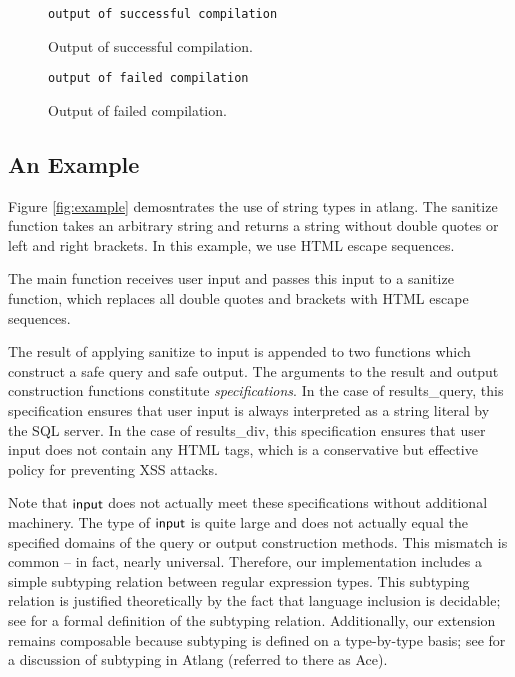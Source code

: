 \documentclass[9pt]{sig-alternate}
\theoremstyle{definition}
\begin{document}
\begin{figure}
\begin{lstlisting}
output of successful compilation
\end{lstlisting}
\caption{Output of successful compilation.}
\end{figure}

\begin{figure}
\begin{lstlisting}
output of failed compilation
\end{lstlisting}
\caption{Output of failed compilation.}
\end{figure}


\subsection{An Example}

Figure \ref{fig:example} demosntrates the use of string types in atlang.
The sanitize function takes an arbitrary string and returns a string without
double quotes or left and right brackets. In this example, we use HTML
escape sequences.

The main function receives user input and passes this input to a 
sanitize function, which replaces all double quotes and brackets with HTML
escape sequences. 

The result of applying sanitize to input is appended to two functions which
construct a safe query and safe output.
The arguments to the result and output construction functions constitute \emph{specifications}.
In the case of \textsf{results_query}, this specification ensures that user input is always interpreted
as a string literal by the SQL server.
In the case of \textsf{results_div}, this specification ensures that user input does 
not contain any HTML tags, which is a conservative but effective policy for preventing
XSS attacks.

Note that ${\sf input}$ does not actually meet these specifications without additional machinery.
The type of ${\sf input}$ is quite large
and does not actually equal the specified domains of the query or output construction
methods. This mismatch is common -- in fact, nearly universal. Therefore, 
our implementation includes a simple subtyping relation between regular expression
types. 
This subtyping relation is justified theoretically by the fact that language inclusion is
decidable; see \cite{fulton12} for a formal definition of the subtyping relation.
Additionally, our extension remains composable because subtyping is defined on a type-by-type basis;
see \cite{fulton13} for a discussion of subtyping in Atlang (referred to there as Ace).
\end{document}
